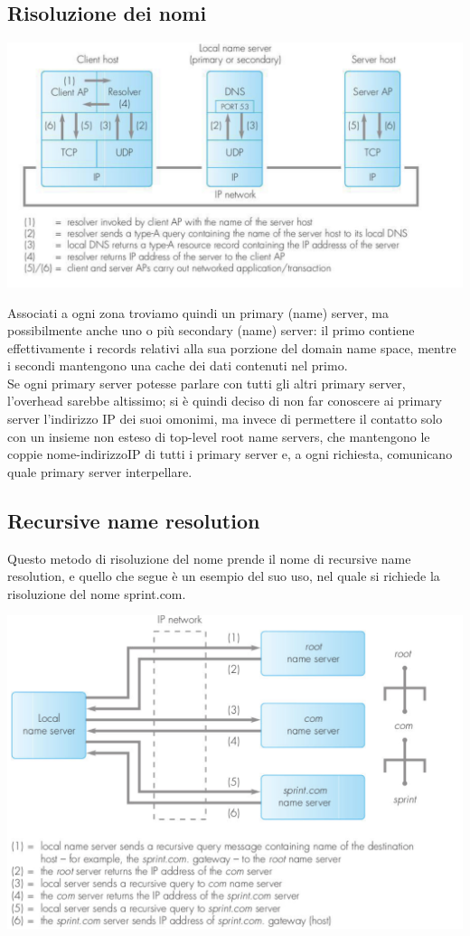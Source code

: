 \documentclass[11pt, oneside]{article}   	%
\begin{document}
\subsection*{Risoluzione dei nomi}
\begin{center}
\includegraphics[scale=0.5]{71}
\end{center}
Associati a ogni zona troviamo quindi un primary (name) server, ma possibilmente anche uno o più secondary (name) server: il primo contiene effettivamente i records relativi alla sua porzione del domain name space, mentre i secondi mantengono una cache dei dati contenuti nel primo.\\
Se ogni primary server potesse parlare con tutti gli altri primary server, l’overhead sarebbe altissimo; si è quindi deciso di non far conoscere ai primary server l’indirizzo IP dei suoi omonimi, ma invece di permettere il contatto solo con un insieme non esteso di top-level root name servers, che mantengono le coppie nome-indirizzoIP di tutti i primary server e, a ogni richiesta, comunicano quale primary server interpellare.
\subsection*{Recursive name resolution}
Questo metodo di risoluzione del nome prende il nome di recursive name resolution, e quello che segue è un esempio del suo uso, nel quale si richiede la risoluzione del nome sprint.com. 
\begin{center}
\includegraphics[scale=0.5]{72}
\end{center}
\end{document}
